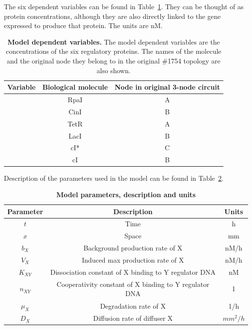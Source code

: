 The six dependent variables can be found in Table~\ref{tab:Model variables}.
They can be thought of as protein concentrations,
although they are also directly linked to the gene expressed to produce that protein.
The units are nM.
\begin{table}[H]
    \centering
    \caption{\textbf{Model dependent variables.} The model dependent variables are the concentrations of the six regulatory proteins.
    The names of the molecule and the original node they belong to in the original \#1754 topology are also shown.}
    \label{tab:Model variables}
    \renewcommand{\arraystretch}{1.3} %
    \begin{tabular}{|c|c|c|}
        \hline
        \textbf{Variable} & \textbf{Biological molecule} & \textbf{Node in original 3-node circuit}\\
        \hline
        [A] & RpaI & A\\
        \hline
        [B] & CinI & B \\
        \hline
        [C] & TetR & A\\
        \hline
        [D] & LacI & B \\
        \hline
        [E] & cI* & C \\
        \hline
        [F] & cI & B \\
        \hline
    \end{tabular}
\end{table}
Description of the parameters used in the model can be found in Table~\ref{tab:model params}.

\begin{table}[H]
    \centering
    \caption{\textbf{Model parameters, description and units}}
    \label{tab:model params}
    \renewcommand{\arraystretch}{1.3} %
    \begin{tabular}{|c|c|c|}
        \hline
        \textbf{Parameter} & \textbf{Description} & \textbf{Units}\\
        \hline
        $t$ & Time & h\\
        \hline
        $x$ & Space & mm\\
        \hline
        $b_{X}$ & Background production rate of X & nM/h\\
        \hline
        $V_{X}$ & Induced max production rate of X & nM/h \\
        \hline
        $K_{XY}$ & Dissociation constant of X binding to Y regulator DNA & nM \\
        \hline
        $n_{XY}$ & Cooperativity constant of X binding to Y regulator DNA & 1\\
        \hline
        $\mu_{X}$ & Degradation rate of X & 1/h\\
        \hline
        $D_{X}$ & Diffusion rate of diffuser X & $mm^2/h$\\
        \hline

    \end{tabular}
\end{table}


